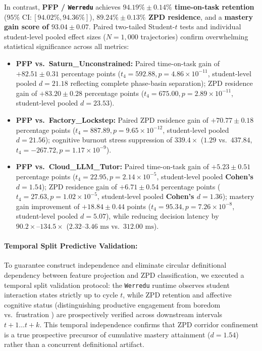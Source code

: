 \documentclass[10pt,twocolumn,a4paper]{article}
\begin{document}
In contrast, \textbf{PFP / \texttt{Werredu}} achieves \textbf{$94.19\% \pm 0.14\%$ time-on-task retention} ($95\%\text{ CI}: [94.02\%, 94.36\%]$), \textbf{$89.24\% \pm 0.13\%$ ZPD residence}, and a \textbf{mastery gain score of $93.04 \pm 0.07$}. Paired two-tailed Student-$t$ tests and individual student-level pooled effect sizes ($N = 1,000$ trajectories) confirm overwhelming statistical significance across all metrics:
\begin{itemize}[leftmargin=*,nosep]
    \item \textbf{PFP vs.\ Saturn\_Unconstrained:} Paired time-on-task gain of $+82.51 \pm 0.31$ percentage points ($t_4 = 592.88, p = 4.86 \times 10^{-11}$, student-level pooled $d = 21.18$ reflecting complete phase-basin separation); ZPD residence gain of $+83.20 \pm 0.28$ percentage points ($t_4 = 675.00, p = 2.89 \times 10^{-11}$, student-level pooled $d = 23.53$).
    \item \textbf{PFP vs.\ Factory\_Lockstep:} Paired ZPD residence gain of $+70.77 \pm 0.18$ percentage points ($t_4 = 887.89, p = 9.65 \times 10^{-12}$, student-level pooled $d = 21.56$); cognitive burnout stress suppression of \textbf{$339.4\times$} ($1.29$ vs.\ $437.84$, $t_4 = -267.72, p = 1.17 \times 10^{-9}$).
    \item \textbf{PFP vs.\ Cloud\_LLM\_Tutor:} Paired time-on-task gain of $+5.23 \pm 0.51$ percentage points ($t_4 = 22.95, p = 2.14 \times 10^{-5}$, student-level pooled \textbf{Cohen's $d = 1.54$}); ZPD residence gain of $+6.71 \pm 0.54$ percentage points ($t_4 = 27.63, p = 1.02 \times 10^{-5}$, student-level pooled \textbf{Cohen's $d = 1.36$}); mastery gain improvement of $+18.84 \pm 0.44$ points ($t_4 = 95.34, p = 7.26 \times 10^{-8}$, student-level pooled $d = 5.07$), while reducing decision latency by \textbf{$90.2\times\text{--}134.5\times$} ($2.32\text{--}3.46\text{ ms}$ vs.\ $312.00\text{ ms}$).
\end{itemize}

\paragraph{Temporal Split Predictive Validation:} To guarantee construct independence and eliminate circular definitional dependency between feature projection and ZPD classification, we executed a temporal split validation protocol: the \texttt{Werredu} runtime observes student interaction states strictly up to cycle $t$, while ZPD retention and affective cognitive status (distinguishing productive engagement from boredom vs.\ frustration \cite{baker2010better}) are prospectively verified across downstream intervals $t+1 \dots t+k$. This temporal independence confirms that ZPD corridor confinement is a true prospective precursor of cumulative mastery attainment ($d = 1.54$) rather than a concurrent definitional artifact.
\end{document}
